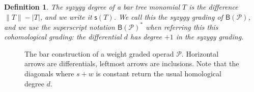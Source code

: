 \documentclass[fleqn, a4paper, twoside]{article}
\makeatletter
\newcommand{\antishriek}{\text{\raisebox{\depth}{\textexclamdown}}}
\newcommand{\0}{\langle 0\rangle}
\newcommand{\B}[1]{\mathsf{B}(#1)}
\newcommand{\syz}[1]{\mathsf{s}(#1)}
\let\[\@undefined
\DeclareRobustCommand{\[}{\begin{equation}}%
\let\]\@undefined
\DeclareRobustCommand{\]}{\end{equation}}%
\theoremstyle{mytheorem}
\theoremstyle{introthm}
\theoremstyle{mydefinition}
\newtheorem{definition}[theorem]{Definition}
\theoremstyle{mydefinition2}
\theoremstyle{plain} %
\newcommand{\?}{\,?\,}
\newcommand{\kk}{\Bbbk}
\newcommand{\PP}{{\mathcal{P}}}
\theoremstyle{mytheorem}
\theoremstyle{plain} %
\makeatother
\begin{document}
\begin{definition}
The syzygy degree of a bar tree monomial $T$ is the difference
$\lVert T\rVert - |T|$, and we write it $\syz{T}$. We call this
the syzygy grading of $\B{\PP}$, and we use the superscript
notation $\B{\PP}^*$ when referring this this cohomological
grading: the differential $d$ has degree $+1$ in the syzygy
grading.
\end{definition}

\begin{figure}
\[
\]
\caption{The bar construction of a weight graded operad $\PP$. Horizontal arrows
are differentials, leftmost arrows are inclusions. Note
that the diagonals where $s+w$ is constant return the
usual homological degree $d$. }
\end{figure}
\end{document}

